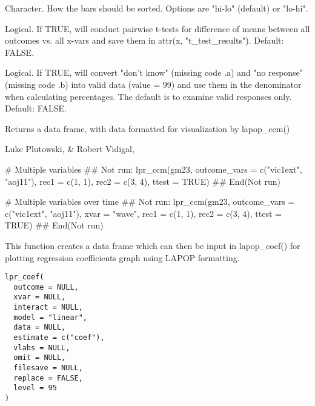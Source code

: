 \documentclass[a4paper]{book}
\begin{document}
\begin{Arguments}
\begin{ldescription}
\item[\code{order}] Character.  How the bars should be sorted.  Options are "hi-lo"
(default) or "lo-hi".

\item[\code{ttest}] Logical.  If TRUE, will conduct pairwise t-tests for difference
of means between all outcomes vs. all x-vars and save them in attr(x,
"t\_test\_results"). Default: FALSE.

\item[\code{keep\_nr}] Logical.  If TRUE, will convert "don't know" (missing code .a)
and "no response" (missing code .b) into valid data (value = 99) and use them
in the denominator when calculating percentages.  The default is to examine
valid responses only.  Default: FALSE.
\end{ldescription}
\end{Arguments}
%
\begin{Value}
Returns a data frame, with data formatted for visualization by lapop\_ccm()
\end{Value}
%
\begin{Author}
Luke Plutowski,  \& Robert Vidigal, 
\end{Author}
%
\begin{Examples}
\begin{ExampleCode}
# Multiple variables
## Not run: lpr_ccm(gm23,
outcome_vars = c("vic1ext", "aoj11"),
rec1 = c(1, 1),
rec2 = c(3, 4),
ttest = TRUE)
## End(Not run)

# Multiple variables over time
## Not run: lpr_ccm(gm23,
outcome_vars = c("vic1ext", "aoj11"),
xvar = "wave",
rec1 = c(1, 1),
rec2 = c(3, 4),
ttest = TRUE)
## End(Not run)
\end{ExampleCode}
\end{Examples}
%
\begin{Description}
This function creates a data frame which can then be input in lapop\_coef() for
plotting regression coefficients graph using LAPOP formatting.
\end{Description}
%
\begin{Usage}
\begin{verbatim}
lpr_coef(
  outcome = NULL,
  xvar = NULL,
  interact = NULL,
  model = "linear",
  data = NULL,
  estimate = c("coef"),
  vlabs = NULL,
  omit = NULL,
  filesave = NULL,
  replace = FALSE,
  level = 95
)
\end{verbatim}
\end{Usage}
\end{document}
